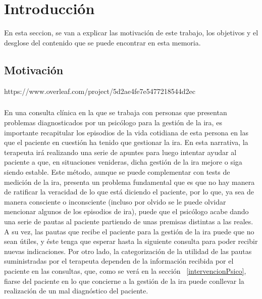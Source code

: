 %
%

\chapter{Introducción}

En esta seccion, se van a explicar las motivación de este trabajo, los objetivos y el desglose del contenido que se puede encontrar en esta memoria.

\section{Motivación}
https://www.overleaf.com/project/5d2ae4fe7e5477218544d2ec
\paragraph{}
En una consulta clínica en la que se trabaja con personas que presentan problemas diagnosticados por un psicólogo para la gestión de la ira, es importante recapitular los episodios de la vida cotidiana de esta persona en las que el paciente en cuestión ha tenido que gestionar la ira. En esta narrativa, la terapeuta irá realizando una serie de apuntes para luego intentar ayudar al paciente a que, en situaciones venideras, dicha gestión de la ira mejore o siga siendo estable. Este método, aunque se puede complementar con tests de medición de la ira, presenta un problema fundamental que es que no hay manera de ratificar la veracidad de lo que está diciendo el paciente, por lo que, ya sea de manera consciente o inconsciente (incluso por olvido se le puede olvidar mencionar algunos de los episodios de ira), puede que el psicólogo acabe dando una serie de pautas al paciente partiendo de unas premisas distintas a las reales. A su vez, las pautas que recibe el paciente para la gestión de la ira puede que no sean útiles, y éste tenga que esperar hasta la siguiente consulta para poder recibir nuevas indicaciones. Por otro lado, la categorización de la utilidad de las pautas suministradas por el terapeuta dependen de la información recibida por el paciente en las consultas, que, como se verá en la sección ~\ref{intervencionPsico}, fiarse del paciente en lo que concierne a la gestión de la ira puede conllevar la realización de un mal diagnóstico del paciente.

